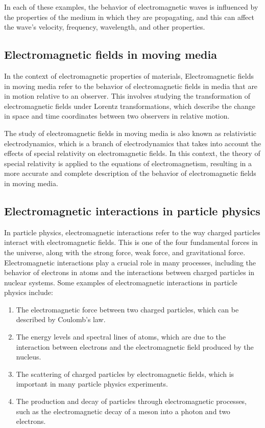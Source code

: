 \documentclass{article}
\begin{document}
In each of these examples, the behavior of electromagnetic waves is influenced
by the properties of the medium in which they are propagating, and this can
affect the wave's velocity, frequency, wavelength, and other properties.
\subsection{Electromagnetic fields in moving media} %
\label{ssub:Electromagnetic fields in moving media}
In the context of electromagnetic properties of materials, Electromagnetic
fields in moving media refer to the behavior of electromagnetic fields in media
that are in motion relative to an observer. This involves studying the
transformation of electromagnetic fields under Lorentz transformations, which
describe the change in space and time coordinates between two observers in
relative motion.

The study of electromagnetic fields in moving media is also known as
relativistic electrodynamics, which is a branch of electrodynamics that takes
into account the effects of special relativity on electromagnetic fields. In
this context, the theory of special relativity is applied to the equations of
electromagnetism, resulting in a more accurate and complete description of the
behavior of electromagnetic fields in moving media.
\subsection{Electromagnetic interactions in particle physics} %
\label{ssub:Electromagnetic interactions in particle physics}
In particle physics, electromagnetic interactions refer to the way charged
particles interact with electromagnetic fields. This is one of the four
fundamental forces in the universe, along with the strong force, weak force,
and gravitational force. Electromagnetic interactions play a crucial role in
many processes, including the behavior of electrons in atoms and the
interactions between charged particles in nuclear systems. Some examples of
electromagnetic interactions in particle physics include:

\begin{enumerate}
  \item The electromagnetic force between two charged particles, which can be described by Coulomb's law.
  \item The energy levels and spectral lines of atoms, which are due to the interaction between electrons and the electromagnetic field produced by the nucleus.
  \item The scattering of charged particles by electromagnetic fields, which is important in many particle physics experiments.
  \item The production and decay of particles through electromagnetic processes, such as the electromagnetic decay of a meson into a photon and two electrons.
\end{enumerate}
\end{document}

